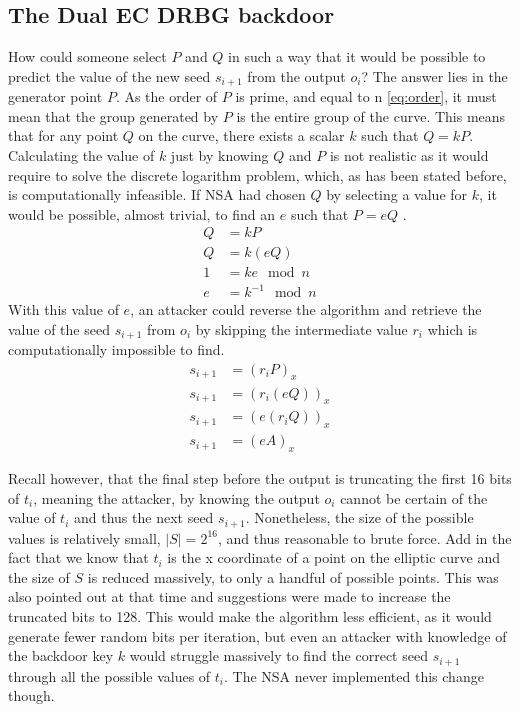 \subsection{The Dual EC DRBG backdoor}
How could someone select $P$ and $Q$ in such a way that it would be possible to predict the value of the new seed $s_{i + 1}$ from the output $o_i$? The answer lies in the generator point $P$. As the order of $P$ is prime, and equal to n \eqref{eq:order}, it must mean that the group generated by $P$ is the entire group of the curve. This means that for any point $Q$ on the curve, there exists a scalar $k$ such that $Q = kP$. Calculating the value of $k$ just by knowing $Q$ and $P$ is not realistic as it would require to solve the discrete logarithm problem, which, as has been stated before, is computationally infeasible. If NSA had chosen $Q$ by selecting a value for $k$, it would be possible, almost trivial, to find an $e$ such that $P = eQ$ \cite{backdoor}.
\begin{align}
    Q &= kP \nonumber \\
    Q &= k(eQ) \nonumber \\
    1 &= ke \mod n \nonumber \\
    e &= k^{-1} \mod n
\end{align}
With this value of $e$, an attacker could reverse the algorithm and retrieve the value of the seed $s_{i + 1}$ from $o_i$ by skipping the intermediate value $r_i$ which is computationally impossible to find.
\begin{align}
    s_{i + 1} &= {(r_iP)}_x \nonumber \\
    s_{i + 1} &= {(r_i(eQ))}_x \nonumber \\
    s_{i + 1} &= {(e(r_iQ))}_x \nonumber \\
    s_{i + 1} &= {(eA)}_x 
\end{align}

Recall however, that the final step before the output is truncating the first 16 bits of $t_i$, meaning the attacker, by knowing the output $o_i$ cannot be certain of the value of $t_i$ and thus the next seed $s_{i + 1}$. Nonetheless, the size of the possible values is relatively small, $|S| = 2^{16}$, and thus reasonable to brute force. Add in the fact that we know that $t_i$ is the x coordinate of a point on the elliptic curve and the size of $S$ is reduced massively, to only a handful of possible points. This was also pointed out at that time \cite{backdoor} and suggestions were made to increase the truncated bits to 128. This would make the algorithm less efficient, as it would generate fewer random bits per iteration, but even an attacker with knowledge of the backdoor key $k$ would struggle massively to find the correct seed $s_{i + 1}$ through all the possible values of $t_i$. The NSA never implemented this change though.


